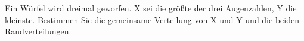 \begin{Exercise}[label=ex:2.7]
Ein Würfel wird dreimal geworfen. X sei die größte der drei Augenzahlen, Y die kleinste. Bestimmen Sie die gemeinsame Verteilung von X und Y und die beiden Randverteilungen. \\
\end{Exercise}
\begin{Answer}
\end{Answer}
